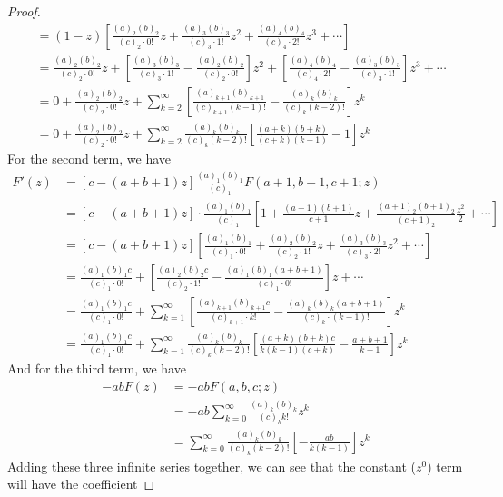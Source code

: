\documentclass[../psets.tex]{subfiles}
\begin{document}
\begin{enumerate}[ref={A.\arabic*}]
\begin{proof}
\begin{align*}
            &= (1-z)\left[ \frac{(a)_2(b)_2}{(c)_2\cdot 0!}z+\frac{(a)_3(b)_3}{(c)_3\cdot 1!}z^2+\frac{(a)_4(b)_4}{(c)_4\cdot 2!}z^3+\cdots \right]\\
            &= \frac{(a)_2(b)_2}{(c)_2\cdot 0!}z+\left[ \frac{(a)_3(b)_3}{(c)_3\cdot 1!}-\frac{(a)_2(b)_2}{(c)_2\cdot 0!} \right]z^2+\left[ \frac{(a)_4(b)_4}{(c)_4\cdot 2!}-\frac{(a)_3(b)_3}{(c)_3\cdot 1!} \right]z^3+\cdots\\
            &= 0+\frac{(a)_2(b)_2}{(c)_2\cdot 0!}z+\sum_{k=2}^\infty\left[ \frac{(a)_{k+1}(b)_{k+1}}{(c)_{k+1}(k-1)!}-\frac{(a)_k(b)_k}{(c)_k(k-2)!} \right]z^k\\
            &= 0+\frac{(a)_2(b)_2}{(c)_2\cdot 0!}z+\sum_{k=2}^\infty\frac{(a)_k(b)_k}{(c)_k(k-2)!}\left[ \frac{(a+k)(b+k)}{(c+k)(k-1)}-1 \right]z^k
        \end{align*}
        For the second term, we have
        \begin{align*}
            [c-(a+b+1)z]F'(z) &= [c-(a+b+1)z]\frac{(a)_1(b)_1}{(c)_1}F(a+1,b+1,c+1;z)\\
            &= [c-(a+b+1)z]\cdot\frac{(a)_1(b)_1}{(c)_1}\left[ 1+\frac{(a+1)(b+1)}{c+1}z+\frac{(a+1)_2(b+1)_2}{(c+1)_2}\frac{z^2}{2}+\cdots \right]\\
            &= [c-(a+b+1)z]\left[ \frac{(a)_1(b)_1}{(c)_1\cdot 0!}+\frac{(a)_2(b)_2}{(c)_2\cdot 1!}z+\frac{(a)_3(b)_3}{(c)_3\cdot 2!}z^2+\cdots \right]\\
            &= \frac{(a)_1(b)_1c}{(c)_1\cdot 0!}+\left[ \frac{(a)_2(b)_2c}{(c)_2\cdot 1!}-\frac{(a)_1(b)_1(a+b+1)}{(c)_1\cdot 0!} \right]z+\cdots\\
            &= \frac{(a)_1(b)_1c}{(c)_1\cdot 0!}+\sum_{k=1}^\infty\left[ \frac{(a)_{k+1}(b)_{k+1}c}{(c)_{k+1}\cdot k!}-\frac{(a)_k(b)_k(a+b+1)}{(c)_k\cdot(k-1)!} \right]z^k\\
            &= \frac{(a)_1(b)_1c}{(c)_1\cdot 0!}+\sum_{k=1}^\infty\frac{(a)_k(b)_k}{(c)_k(k-2)!}\left[ \frac{(a+k)(b+k)c}{k(k-1)(c+k)}-\frac{a+b+1}{k-1} \right]z^k
        \end{align*}
        And for the third term, we have
        \begin{align*}
            -abF(z) &= -abF(a,b,c;z)\\
            &= -ab\sum_{k=0}^\infty\frac{(a)_k(b)_k}{(c)_kk!}z^k\\
            &= \sum_{k=0}^\infty\frac{(a)_k(b)_k}{(c)_k(k-2)!}\left[ -\frac{ab}{k(k-1)} \right]z^k
        \end{align*}
        Adding these three infinite series together, we can see that the constant ($z^0$) term will have the coefficient

\end{proof}
\end{enumerate}
\end{document}
